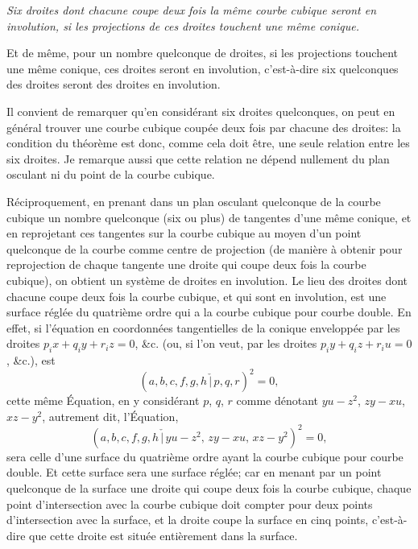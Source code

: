 \documentclass[11pt,a4paper]{article}
\begin{document}
\medskip
\noindent\textit{Six droites dont chacune coupe deux fois la m\^{e}me courbe cubique seront en involution, si les projections de ces droites touchent une m\^{e}me conique.}
\medskip

Et de m\^{e}me, pour un nombre quelconque de droites, si les projections touchent une m\^{e}me conique, ces droites seront en involution, c'est-\`{a}-dire six quelconques des droites seront des droites en involution.

Il convient de remarquer qu'en consid\'{e}rant six droites quelconques, on peut en g\'{e}n\'{e}ral trouver une courbe cubique coup\'{e}e deux fois par chacune des droites: la condition du th\'{e}or\`{e}me est donc, comme cela doit \^{e}tre, une seule relation entre les six droites. Je remarque aussi que cette relation ne d\'{e}pend nullement du plan osculant ni du point de la courbe cubique.

\clearpage

R\'{e}ciproquement, en prenant dans un plan osculant quelconque de la courbe cubique un nombre quelconque (six ou plus) de tangentes d'une m\^{e}me conique, et en reprojetant ces tangentes sur la courbe cubique au moyen d'un point quelconque de la courbe comme centre de projection (de mani\`{e}re \`{a} obtenir pour reprojection de chaque tangente une droite qui coupe deux fois la courbe cubique), on obtient un syst\`{e}me de droites en involution. Le lieu des droites dont chacune coupe deux fois la courbe cubique, et qui sont en involution, est une surface r\'{e}gl\'{e}e du quatri\`{e}me ordre qui a la courbe cubique pour courbe double. En effet, si l'\'{e}quation en coordonn\'{e}es tangentielles de la conique envelopp\'{e}e par les droites $p_i x + q_i y + r_i z = 0$, \&c. (ou, si l'on veut, par les droites $p_i y + q_i z + r_i u = 0$, \&c.), est
\[
(a, b, c, f, g, h \,\check{\!|\,} p, q, r)^2 = 0,
\]
cette m\^{e}me \'{E}quation, en y consid\'{e}rant $p$, $q$, $r$ comme d\'{e}notant $yu - z^2$, $zy - xu$, $xz - y^2$, autrement dit, l'\'{E}quation,
\[
(a, b, c, f, g, h \,\check{\!|\,} yu - z^2, \, zy - xu, \, xz - y^2)^2 = 0,
\]
sera celle d'une surface du quatri\`{e}me ordre ayant la courbe cubique pour courbe double. Et cette surface sera une surface r\'{e}gl\'{e}e; car en menant par un point quelconque de la surface une droite qui coupe deux fois la courbe cubique, chaque point d'intersection avec la courbe cubique doit compter pour deux points d'intersection avec la surface, et la droite coupe la surface en cinq points, c'est-\`{a}-dire que cette droite est situ\'{e}e enti\`{e}rement dans la surface.
\end{document}
